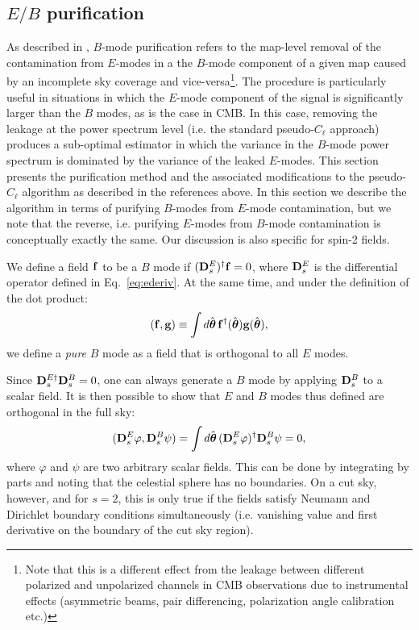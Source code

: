 \documentclass[usenatbib]{mnrasb}
\newcommand{\nv}{\hat{\boldsymbol{\theta}}}
\begin{document}
    \subsection{\texorpdfstring{$E/B$}{E/B} purification}\label{ssec:maths.pureb}
      As described in \cite{2002PhRvD..65b3505L,2003PhRvD..67b3501B,2006PhRvD..74h3002S,2010PhRvD..82b3001Z,2010A&A...519A.104K,2011PhRvD..83h3003B}, $B$-mode purification refers to the map-level removal of the contamination from $E$-modes in a the $B$-mode component of a given map caused by an incomplete sky coverage and vice-versa\footnote{Note that this is a different effect from the leakage between different polarized and unpolarized channels in CMB observations due to instrumental effects (asymmetric beams, pair differencing, polarization angle calibration etc.)}. The procedure is particularly useful in situations in which the $E$-mode component of the signal is significantly larger than the $B$ modes, as is the case in CMB. In this case, removing the leakage at the power spectrum level (i.e. the standard pseudo-$C_\ell$ approach) produces a sub-optimal estimator in which the variance in the $B$-mode power spectrum is dominated by the variance of the leaked $E$-modes. This section presents the purification method and the associated modifications to the pseudo-$C_\ell$ algorithm as described in the references above. In this section we describe the algorithm in terms of purifying $B$-modes from $E$-mode contamination, but we note that the reverse, i.e. purifying $E$-modes from $B$-mode contamination is conceptually exactly the same. Our discussion is also specific for spin-2 fields.
      
      We define a field ${\bf f}$ to be a $B$ mode if $({\bf D}^{E}_s)^\dag{\bf f}=0$, where ${\bf D}^{E}_s$ is the differential operator defined in Eq.~\ref{eq:ederiv}. At the same time, and under the definition of the dot product:
      \begin{equation}
        ({\bf f},{\bf g})\equiv\int d\nv\,{\bf f}^\dag(\nv){\bf g}(\nv),
      \end{equation}
      we define a \emph{pure} $B$ mode as a field that is orthogonal to all $E$ modes.
      
      Since ${\bf D}^{E\dag}_s{\bf D}^B_s=0$, one can always generate a $B$ mode by applying ${\bf D}^{B}_s$ to a scalar field. It is then possible to show that $E$ and $B$ modes thus defined are orthogonal in the full sky:
      \begin{equation}
        ({\bf D}^E_s\varphi,{\bf D}^B_s\psi)=\int d\nv\,({\bf D}^E_s\varphi)^\dag{\bf D}^B_s\psi=0,
      \end{equation}
      where $\varphi$ and $\psi$ are two arbitrary scalar fields. This can be done by integrating by parts and noting that the celestial sphere has no boundaries. On a cut sky, however, and for $s=2$, this is only true if the fields satisfy Neumann and Dirichlet boundary conditions simultaneously (i.e. vanishing value and first derivative on the boundary of the cut sky region). 
  
\end{document}
